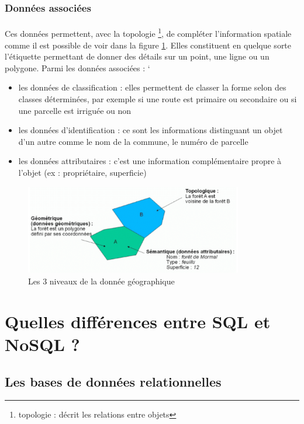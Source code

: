 \subsubsection{Données associées}
\paragraph{}Ces données permettent, avec la topologie \footnote{topologie : décrit les relations entre objets}, de compléter l’information spatiale \supercite{courssig2} comme il est possible de voir dans la figure \ref{fig:besoinSpatial}. Elles constituent en quelque sorte l’étiquette permettant de donner des détails sur un point, une ligne ou un polygone. Parmi les données associées :
`\begin{itemize}[label=\textbullet]
    \item les données de classification : elles permettent de classer la forme selon des classes déterminées, par exemple si une route est primaire ou secondaire ou si une parcelle est irriguée ou non
    \item les données d’identification : ce sont les informations distinguant un objet d’un autre comme le nom de la commune, le numéro de parcelle
    \item les données attributaires  : c’est une information complémentaire propre à l’objet (ex : propriétaire, superficie)
\end{itemize}

\begin{figure}[htp]
  \centering
  \includegraphics[width=95mm]{src_img/exempleBDS.png}
  \caption{Les 3 niveaux de la donnée géographique \supercite{ensg}}
  \label{fig:besoinSpatial}
\end{figure}

\section{Quelles différences entre SQL et NoSQL ?}

\subsection{Les bases de données relationnelles}

